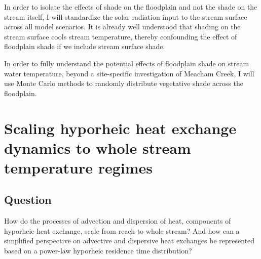 \documentclass[a4paper]{article}
\begin{document}
In order to isolate the effects of shade on the floodplain and not the shade on the stream itself, I will standardize the solar radiation input to the stream surface across all model scenarios. It is already well understood that shading on the stream surface cools stream temperature, thereby confounding the effect of floodplain shade if we include stream surface shade. 

In order to fully  understand the potential effects of floodplain shade on stream water temperature, beyond a site-specific investigation of Meacham Creek, I will use Monte Carlo methods to randomly distribute vegetative shade across the floodplain.





\section{Scaling hyporheic heat exchange dynamics to whole stream temperature regimes} 

\subsection*{Question}
How do the processes of advection and dispersion of heat, components of hyporheic heat exchange, scale from reach to whole stream? And how can a simplified perspective on advective and dispersive heat exchanges  be represented based on a power-law hyporheic residence time distribution?

\end{document}
